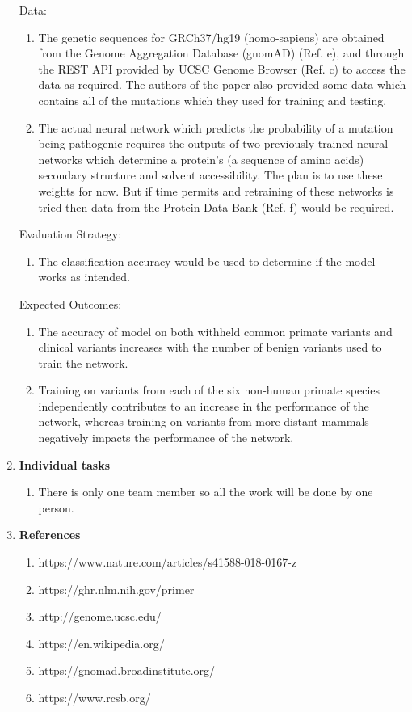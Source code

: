 \documentclass[twoside]{article}
\begin{document}
\begin{enumerate}
	 Data:
     \begin{enumerate}     
     \item The genetic sequences for GRCh37/hg19 (homo-sapiens) are obtained from the Genome Aggregation Database (gnomAD) (Ref. e), and through the REST API provided by UCSC Genome Browser (Ref. c) to access the data as required. The authors of the paper also provided some data which contains all of the mutations which they used for training and testing.
     \item The actual neural network which predicts the probability of a mutation being pathogenic requires the outputs of two previously trained neural networks which determine a protein's (a sequence of amino acids) secondary structure and solvent accessibility. The plan is to use these weights for now. But if time permits and retraining of these networks is tried then data from the Protein Data Bank (Ref. f) would be required.
     \end{enumerate}
\pagebreak
 	 Evaluation Strategy:
 	 \begin{enumerate}
 	 	\item The classification accuracy would be used to determine if the model works as intended.
 	 \end{enumerate}
  
  	 Expected Outcomes:
  	 \begin{enumerate}
  	 	\item The accuracy of model on both withheld common primate variants and clinical variants increases with the number of benign variants used to train the network.
  	 	\item Training on variants from each of the six non-human primate species independently contributes to an increase in the performance of the network, whereas training on variants from more distant mammals negatively impacts the performance of the network.
  	 \end{enumerate}

\item \textbf{Individual tasks}
     \begin{enumerate}
     \item There is only one team member so all the work will be done by one person.
     \end{enumerate}

\item \textbf{References}
     \begin{enumerate}
     \item https://www.nature.com/articles/s41588-018-0167-z
     \item https://ghr.nlm.nih.gov/primer
     \item http://genome.ucsc.edu/
     \item https://en.wikipedia.org/
     \item https://gnomad.broadinstitute.org/
     \item https://www.rcsb.org/
     \end{enumerate}
\end{enumerate}
\newpage
\end{document}
